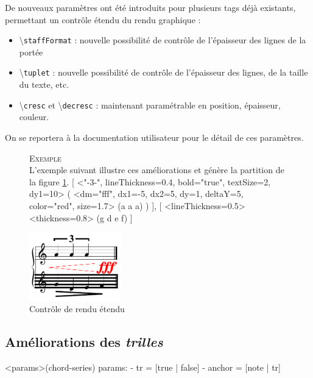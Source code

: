 \documentclass{article}
\newenvironment{gmncode}	{\vspace{-2mm}\small\verbatim}{\endverbatim\vspace{-2mm}}
\newcommand{\code}[1]		{{\small \texttt{#1}}}
\newcommand{\guidotag}[1]	{\textbackslash\code{#1}}
\newcommand{\exemple}		{\vspace{2mm}\hspace*{-3mm}\textsc{Exemple}}
\begin{document}
De nouveaux paramètres ont été introduits pour plusieurs tags déjà existants, permettant un contrôle étendu du rendu graphique :
\begin{itemize}
\item \guidotag{staffFormat} : nouvelle possibilité de contrôle de l'épaisseur des lignes de la portée
\item \guidotag{tuplet} : nouvelle possibilité de contrôle de l'épaisseur des lignes, de la taille du texte, etc.
\item \guidotag{cresc} et \guidotag{decresc} : maintenant paramétrable en position, épaisseur, couleur.
\end{itemize}
On se reportera à la documentation utilisateur pour le détail de ces paramètres.

\begin{figure}[h]
\exemple\\
L'exemple suivant illustre ces améliorations et génère la partition de la figure \ref{fig:nouveauxParams}.
\begin{gmncode}
{
  [ \tuplet<"-3-", lineThickness=0.4,
        bold="true", textSize=2, dy1=10> (
      \cresc<dm="fff", dx1=-5, dx2=5,
          dy=1, deltaY=5, color="red",
          size=1.7> (a a a) )
  ],
  [ \staffFormat<lineThickness=0.5>
    \decresc<thickness=0.8> (g d e f)
  ]
}
\end{gmncode}
\begin{center}
\includegraphics[width=40mm]{img/partitions/nouveauxParams.pdf}
\end{center}
\caption{Contrôle de rendu étendu}
\label{fig:nouveauxParams}
\end{figure}


\subsection{Améliorations des \emph{trilles}}\label{subsec:trilles}
\vspace{1mm}

\begin{gmncode}
  \trill<params>(chord-series)
   params:
    - tr = [true | false]
    - anchor = [note | tr]
\end{gmncode}
\end{document}
